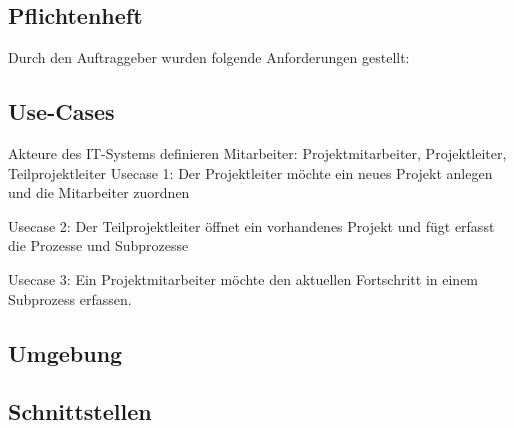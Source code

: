 \subsection{Pflichtenheft}
Durch den Auftraggeber wurden folgende Anforderungen gestellt:

\subsection{Use-Cases}
Akteure des IT-Systems definieren
Mitarbeiter: Projektmitarbeiter, Projektleiter, Teilprojektleiter
Usecase 1:
Der Projektleiter möchte ein neues Projekt anlegen und die Mitarbeiter zuordnen

Usecase 2:
Der Teilprojektleiter öffnet ein vorhandenes Projekt und fügt erfasst die Prozesse und Subprozesse

Usecase 3:
Ein Projektmitarbeiter möchte den aktuellen Fortschritt in einem Subprozess erfassen.

\subsection{Umgebung}
\subsection{Schnittstellen}